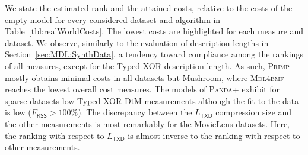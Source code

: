 We state the estimated rank and the attained costs, relative to the costs of the empty model for every considered dataset and algorithm in Table~\ref{tbl:realWorldCosts}. The lowest costs are highlighted for each measure and dataset. We observe, similarly to the evaluation of description lengths in Section~\ref{sec:MDL:SynthData}, a tendency toward compliance among the rankings of all measures, except for the Typed XOR description length. 
As such, \textsc{Primp} mostly obtains minimal costs in all datasets but Mushroom, where \textsc{Mdl4bmf} reaches the lowest overall cost measures. The models of \textsc{Panda+} exhibit for sparse datasets low Typed XOR DtM measurements although the fit to the data is low ($F_\mathsf{RSS}>100\%$). The discrepancy between the $L_\mathsf{TXD}$ compression size and the other measurements is most remarkably for the MovieLens datasets. Here, the ranking with respect to $L_\mathsf{TXD}$ is  almost inverse to the ranking with respect to other measurements.

